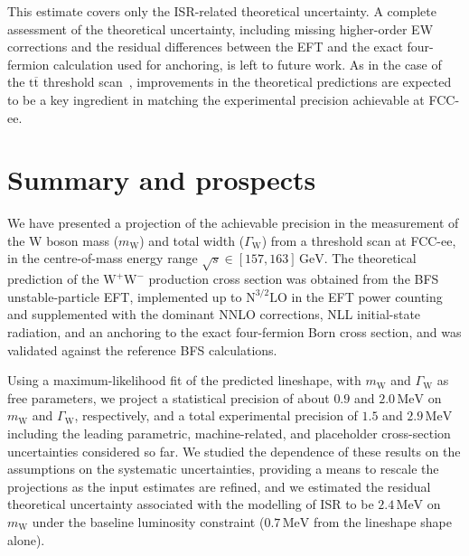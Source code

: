 \documentclass[a4paper,11pt]{article}
\newcommand{\ttbar}{\ensuremath{\mathrm{t\overline{t}}}\xspace}
\newcommand{\WW}{\ensuremath{\mathrm{W^+W^-}}\xspace}
\newcommand{\sqrts}{\ensuremath{\sqrt{s}}\xspace}
\newcommand{\mW}{\ensuremath{m_\mathrm{W}}\xspace}
\newcommand{\GW}{\ensuremath{\Gamma_\mathrm{W}}\xspace}
\newcommand{\NhalfLO}{\ensuremath{\mathrm{N^{3/2}LO}}\xspace}
\newcommand{\GeV}{\ensuremath{\,\mathrm{GeV}}\xspace}
\newcommand{\MeV}{\ensuremath{\,\mathrm{MeV}}\xspace}
\begin{document}
This estimate covers only the ISR-related theoretical uncertainty.
A complete assessment of the theoretical uncertainty, including missing
higher-order EW corrections and the residual differences between the
EFT and the exact four-fermion calculation used for anchoring, is left
to future work. As in the case of the \ttbar threshold
scan~\cite{Defranchis:2025hfh}, improvements in the theoretical
predictions are expected to be a key ingredient in matching the
experimental precision achievable at FCC-ee.


\section{Summary and prospects}
\label{sec:summary}

We have presented a projection of the achievable precision in the
measurement of the W boson mass (\mW) and total width (\GW) from a
threshold scan at FCC-ee, in the centre-of-mass energy range
$\sqrts\in[157,163]\GeV$. The theoretical prediction of the \WW
production cross section was obtained from the BFS unstable-particle EFT,
implemented up to \NhalfLO in the EFT power counting and supplemented
with the dominant NNLO corrections, NLL initial-state radiation, and an
anchoring to the exact four-fermion Born cross section, and was validated
against the reference BFS calculations.

Using a maximum-likelihood fit of the predicted lineshape, with \mW and
\GW as free parameters, we project a statistical precision of about $0.9$
and $2.0\MeV$ on \mW and \GW, respectively, and a total experimental
precision of $1.5$ and $2.9\MeV$ including the leading parametric,
machine-related, and placeholder cross-section uncertainties considered
so far. We studied the
dependence of these results on the assumptions on the systematic
uncertainties, providing a means to rescale the projections as the input
estimates are refined, and we estimated the residual theoretical
uncertainty associated with the modelling of ISR to be $2.4\MeV$ on \mW
under the baseline luminosity constraint ($0.7\MeV$ from the lineshape
shape alone).
\end{document}
